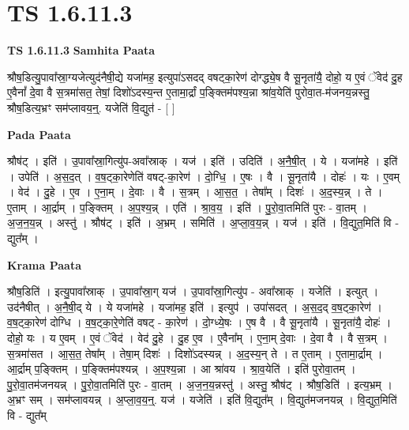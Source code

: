 \documentclass[17pt]{extarticle}
\begin{document}
\section{ TS 1.6.11.3 }

\textbf{TS 1.6.11.3 } \newline
\textbf{Samhita Paata} \newline

श्रौष॒डित्यु॒पावा᳚स्रा॒ग्यजेत्युद॑नैषी॒द्ये यजा॑मह॒ इत्युपा॑ऽसदद् वषट्का॒रेण॑ दोग्द्ध्ये॒ष वै सू॒नृता॑यै॒ दोहो॒ य ए॒वं ॅवेद॑ दु॒ह ए॒वैनां᳚ दे॒वा वै स॒त्रमा॑सत॒ तेषां॒ दिशो॑ऽदस्य॒न्त ए॒तामा॒र्द्रां प॒ङ्क्तिम॑पश्य॒न्ना श्रा॑व॒येति॑ पुरोवा॒त-म॑जनय॒न्नस्तु॒ श्रौष॒डित्य॒भ्रꣳ सम॑प्लावय॒न्॒. यजेति॑ वि॒द्युत॑ - [ ] \newline

\textbf{Pada Paata} \newline

श्रौष॑ट् । इति॑ । उ॒पावा᳚स्रा॒गित्यु॑प-अवा᳚स्राक् । यज॑ । इति॑ । उदिति॑ । अ॒नै॒षी॒त् । ये । यजा॑महे । इति॑ । उपेति॑ । अ॒स॒द॒त् । व॒ष॒ट्का॒रेणेति॑ वषट्-का॒रेण॑ । दो॒ग्धि॒ । ए॒षः । वै । सू॒नृता॑यै । दोहः॑ । यः । ए॒वम् । वेद॑ । दु॒हे । ए॒व । ए॒ना॒म् । दे॒वाः । वै । स॒त्रम् । आ॒स॒त॒ । तेषा᳚म् । दिशः॑ । अ॒द॒स्य॒न्न् । ते । ए॒ताम् । आ॒र्द्राम् । प॒ङ्क्तिम् । अ॒प॒श्य॒न्न् । एति॑ । श्रा॒व॒य॒ । इति॑ । पु॒रो॒वा॒तमिति॑ पुरः - वा॒तम् । अ॒ज॒न॒य॒न्न् । अस्तु॑ । श्रौष॑ट् । इति॑ । अ॒भ्रम् । समिति॑ । अ॒प्ला॒व॒य॒न्न् । यज॑ । इति॑ । वि॒द्युत॒मिति॑ वि - द्युत᳚म् ।  \newline


\textbf{Krama Paata} \newline

श्रौष॒डिति॑ । इत्यु॒पावा᳚स्राक् । उ॒पावा᳚स्रा॒ग् यज॑ । उ॒पावा᳚स्रा॒गित्यु॑प - अवा᳚स्राक् । यजेति॑ । इत्युत् । उद॑नैषीत् । अ॒नै॒षी॒द् ये । ये यजा॑महे । यजा॑मह॒ इति॑ । इत्युप॑ । उपा॑सदत् । अ॒स॒द॒द् व॒ष॒ट्का॒रेण॑ । व॒ष॒ट्का॒रेण॑ दोग्धि । व॒ष॒ट्का॒रे॒णेति॑ वषट् - का॒रेण॑ । दो॒ग्ध्ये॒षः । ए॒ष वै । वै सू॒नृता॑यै । सू॒नृता॑यै॒ दोहः॑ । दोहो॒ यः । य ए॒वम् । ए॒वं ॅवेद॑ । वेद॑ दु॒हे । दु॒ह ए॒व । ए॒वैना᳚म् । ए॒ना॒म् दे॒वाः । दे॒वा वै । वै स॒त्रम् । स॒त्रमा॑सत । आ॒स॒त॒ तेषा᳚म् । तेषा॒म् दिशः॑ । दिशो॑ऽदस्यन्न् । अ॒द॒स्य॒न् ते । त ए॒ताम् । ए॒तामा॒र्द्राम् । आ॒र्द्राम् प॒ङ्क्तिम् । प॒ङ्क्तिम॑पश्यन्न् । अ॒प॒श्य॒न्ना । आ श्रा॑वय । श्रा॒व॒येति॑ । इति॑ पुरोवा॒तम् । पु॒रो॒वा॒तम॑जनयन्न् । पु॒रो॒वा॒तमिति॑ पुरः - वा॒तम् । अ॒ज॒न॒य॒न्नस्तु॑ । अस्तु॒ श्रौष॑ट् । श्रौष॒डिति॑ । इत्य॒भ्रम् । अ॒भ्रꣳ सम् । सम॑प्लावयन्न् । अ॒प्ला॒व॒य॒न्॒. यज॑ । यजेति॑ । इति॑ वि॒द्युत᳚म् । वि॒द्युत॑मजनयन्न् । वि॒द्युत॒मिति॑ वि - द्युत᳚म् \newline
\end{document}
